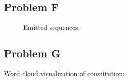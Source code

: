 \documentclass[12pt]{article} %
\begin{document}
\subsection{Problem F}

\begin{figure}[H]
	\vspace{-10mm}
	\caption{Emitted sequences.}
\end{figure}

\subsection{Problem G}
Word cloud visualization of constitution:
\end{document}
